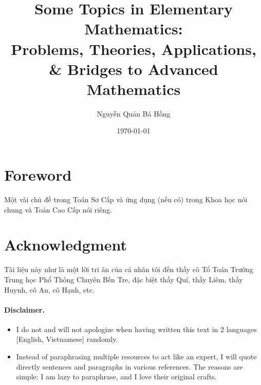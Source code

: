 \documentclass[oneside]{book}
\title{Some Topics in Elementary Mathematics:\\Problems, Theories, Applications, \& Bridges to Advanced Mathematics}
\author{\selectlanguage{vietnamese} Nguyễn Quản Bá Hồng}
\date{\today}
\numberwithin{equation}{section}
\begin{document}
\maketitle
\setcounter{secnumdepth}{3}
\setcounter{tocdepth}{3}
\tableofcontents


\section*{Foreword}
Một vài chủ đề trong Toán Sơ Cấp và ứng dụng (nếu có) trong Khoa học nói chung và Toán Cao Cấp nói riêng.

\section*{Acknowledgment}
Tài liệu này như là một lời tri ân của cá nhân tôi đến thầy cô Tổ Toán Trường Trung học Phổ Thông Chuyên Bến Tre, đặc biệt thầy Quí, thầy Liêm, thầy Huynh, cô An, cô Hạnh, etc.


\paragraph*{Disclaimer.}
\begin{itemize}
	\item I do not and will not apologize when having written this text in 2 languages [English, Vietnamese] randomly.
	\item Instead of paraphrasing multiple resources to act like an expert, I will quote directly sentences and paragraphs in various references. The reasons are simple: I am lazy to paraphrase, and I love their original crafts.
\end{itemize}
\end{document}
